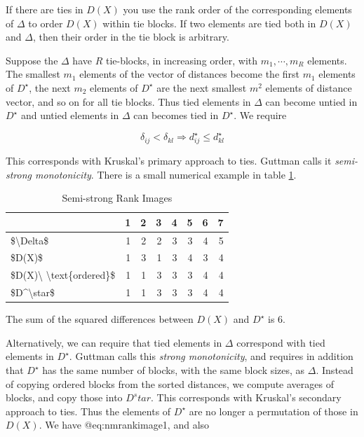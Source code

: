 \documentclass[
  12pt,
]{book}
\theoremstyle{definition}
\theoremstyle{definition}
\theoremstyle{definition}
\theoremstyle{definition}
\theoremstyle{remark}
\begin{document}
If there are ties in \(D(X)\) you use the rank order of the corresponding
elements of \(\Delta\) to order \(D(X)\) within tie blocks. If two elements are tied both in \(D(X)\) and \(\Delta\), then their order in the tie block is arbitrary.

Suppose the \(\Delta\) have \(R\) tie-blocks, in increasing order, with \(m_1,\cdots,m_R\) elements. The smallest \(m_1\) elements of the vector of distances become the first \(m_1\) elements of \(D^\star\), the next \(m_2\) elements of \(D^\star\) are the next smallest \(m^2\) elements of distance vector, and so on for all tie blocks. Thus tied elements in \(\Delta\) can become untied in \(D^\star\) and untied elements in \(\Delta\) can becomes tied in
\(D^\star\). We require

\begin{equation}
\delta_{ij}<\delta_{kl}\Rightarrow d_{ij}^\star\leq d_{kl}^\star
\label{eq:nmrankimage1}
\end{equation}

This corresponds with Kruskal's primary approach to ties. Guttman calls it \emph{semi-strong monotonicity}. There is a small numerical example in table \ref{tab:nmriexample1}.

\begin{table}

\caption{\label{tab:nmriexample1}Semi-strong Rank Images}
\centering
\begin{tabular}[t]{l|r|r|r|r|r|r|r}
\hline
  & 1 & 2 & 3 & 4 & 5 & 6 & 7\\
\hline
\$\textbackslash{}Delta\$ & 1 & 2 & 2 & 3 & 3 & 4 & 5\\
\hline
\$D(X)\$ & 1 & 3 & 1 & 3 & 4 & 3 & 4\\
\hline
\$D(X)\textbackslash{} \textbackslash{}text\{ordered\}\$ & 1 & 1 & 3 & 3 & 3 & 4 & 4\\
\hline
\$D\textasciicircum{}\textbackslash{}star\$ & 1 & 1 & 3 & 3 & 3 & 4 & 4\\
\hline
\end{tabular}
\end{table}

The sum of the squared differences between \(D(X)\) and \(D^\star\) is
6.

Alternatively, we can require that tied elements in \(\Delta\) correspond
with tied elements in \(D^\star\). Guttman calls this \emph{strong monotonicity}, and requires in addition that \(D^\star\) has the same number of blocks, with the same block sizes, as \(\Delta\). Instead of copying ordered blocks from the sorted distances, we compute averages of blocks, and copy those into
\(D^star\). This corresponds with Kruskal's secondary approach to ties. Thus the elements of \(D^\star\) are no longer a permutation of those in \(D(X)\). We have @eq:nmrankimage1, and also
\end{document}
